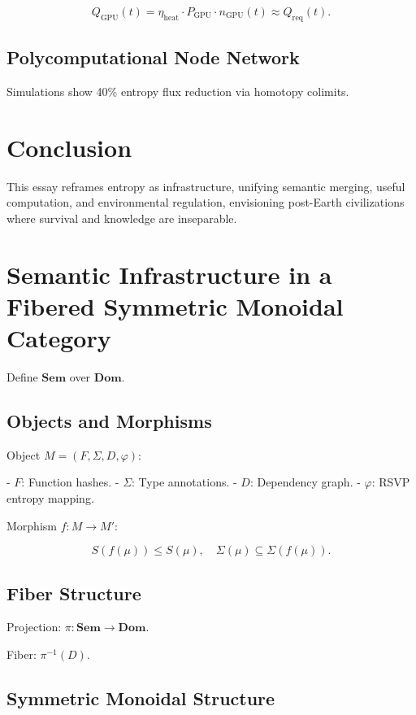 \documentclass[12pt]{article}
\begin{document}
\[ Q_{\text{GPU}}(t) = \eta_{\text{heat}} \cdot P_{\text{GPU}} \cdot n_{\text{GPU}}(t) \approx Q_{\text{req}}(t). \]

\subsection{Polycomputational Node Network}

Simulations show 40\% entropy flux reduction via homotopy colimits.

\section{Conclusion}
\label{sec:conclusion}

This essay reframes entropy as infrastructure, unifying semantic merging, useful computation, and environmental regulation, envisioning post-Earth civilizations where survival and knowledge are inseparable.

\appendix

\section{Semantic Infrastructure in a Fibered Symmetric Monoidal Category}
\label{app:semantic-infra}

Define $ \mathbf{Sem} $ over $ \mathbf{Dom} $.

\subsection{Objects and Morphisms}

Object $ M = (F, \Sigma, D, \varphi) $:

- $ F $: Function hashes.
- $ \Sigma $: Type annotations.
- $ D $: Dependency graph.
- $ \varphi $: RSVP entropy mapping.

Morphism $ f: M \to M' $:

\[ S(f(\mu)) \leq S(\mu), \quad \Sigma(\mu) \subseteq \Sigma(f(\mu)). \]

\subsection{Fiber Structure}

Projection: $ \pi: \mathbf{Sem} \to \mathbf{Dom} $.

Fiber: $ \pi^{-1}(D) $.

\subsection{Symmetric Monoidal Structure}
\end{document}
